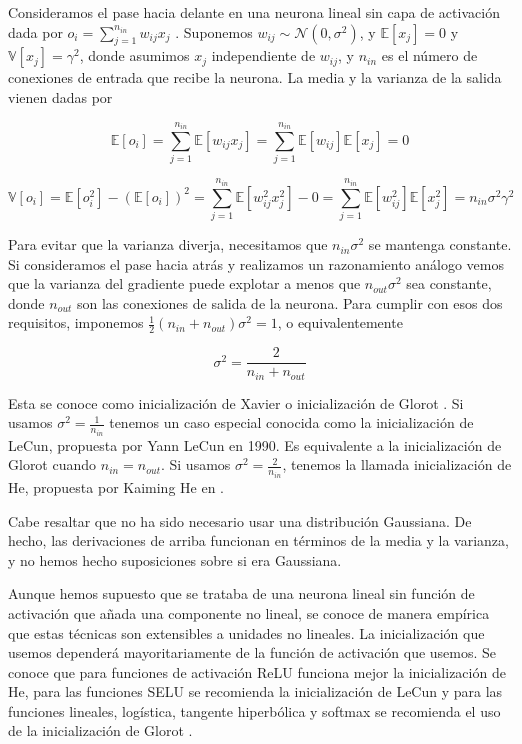 Consideramos el pase hacia delante en una neurona lineal sin capa de activación dada por $o_i = \sum_{j=1}^{n_{in}} w_{ij}x_j$ . Suponemos $w_{ij} \sim \mathcal{N}(0, \sigma^2)$, y $\mathbb{E}[x_j]=0$ y $\mathbb{V}[x_j]=\gamma^2$, donde asumimos $x_j$ independiente de $w_{ij}$, y $n_{in}$ es el número de conexiones de entrada que recibe la neurona. La media y la varianza de la salida vienen dadas por

$$\mathbb{E}[o_i]= \sum_{j=1}^{n_{in}} \mathbb{E}[w_{ij} x_j] = \sum_{j=1}^{n_{in}} \mathbb{E}[w_{ij}] \mathbb{E}[x_j]=0$$

$$\mathbb{V}[o_i] = \mathbb{E}[o_i^2] - (\mathbb{E}[o_i])^2 = \sum_{j=1}^{n_{in}} \mathbb{E}[w_{ij}^2x_j^2] - 0 = \sum_{j=1}^{n_{in}} \mathbb{E}[w_{ij}^2] \mathbb{E}[x_j^2] = n_{in} \sigma^2 \gamma^2$$

Para evitar que la varianza diverja, necesitamos que $n_{in} \sigma^2$ se mantenga constante. Si consideramos el pase hacia atrás y realizamos un razonamiento análogo vemos que la varianza del gradiente puede explotar a menos que $n_{out} \sigma^2$ sea constante, donde $n_{out}$ son las conexiones de salida de la neurona. Para cumplir con esos dos requisitos, imponemos $\frac{1}{2}(n_{in}+n_{out}) \sigma^2 = 1$, o equivalentemente

$$\sigma^2= \frac{2}{n_{in}+n_{out}}$$

Esta se conoce como inicialización de Xavier o inicialización de Glorot \cite{stabilityProblem2}. Si usamos $\sigma^2= \frac{1}{n_{in}}$ tenemos un caso especial conocida como la inicialización de LeCun, propuesta por Yann LeCun en 1990. Es equivalente a la inicialización de Glorot cuando $n_{in}=n_{out}$. Si usamos $\sigma^2 = \frac{2}{n_{in}}$, tenemos la llamada inicialización de He, propuesta por Kaiming He en \cite{heinic}.


Cabe resaltar que no ha sido necesario usar una distribución Gaussiana. De hecho, las derivaciones de arriba funcionan en términos de la media y la varianza, y no hemos hecho suposiciones sobre si era Gaussiana. 


Aunque hemos supuesto que se trataba de una neurona lineal sin función de activación que añada una componente no lineal, se conoce de manera empírica que estas técnicas son extensibles a unidades no lineales. La inicialización que usemos dependerá mayoritariamente de la función de activación que usemos. Se conoce que para funciones de activación ReLU funciona mejor la inicialización de He, para las funciones SELU se recomienda la inicialización de LeCun y para las funciones lineales, logística, tangente hiperbólica y softmax se recomienda el uso de la inicialización de Glorot \cite{murphy2022probabilistic}.